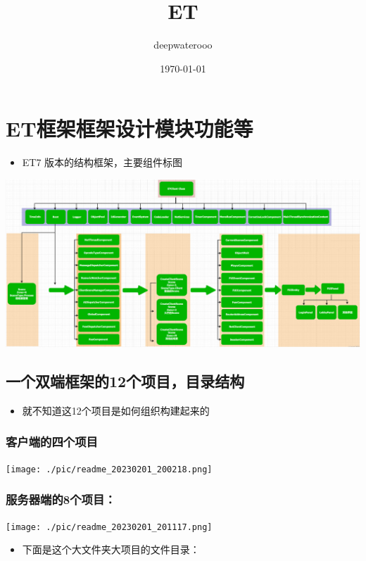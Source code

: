 \documentclass[9pt, b5paper]{article}
\author{deepwaterooo}
\date{\today}
\title{ET}
\begin{document}
\maketitle
\tableofcontents


\section{ET框架框架设计模块功能等}
\label{sec-1}
\begin{itemize}
\item ET7 版本的结构框架，主要组件标图
\end{itemize}

\includegraphics[width=.9\linewidth]{./pic/readme_20230217_092732.png}
\subsection{一个双端框架的12个项目，目录结构}
\label{sec-1-1}
\begin{itemize}
\item 就不知道这12个项目是如何组织构建起来的
\end{itemize}
\subsubsection{客户端的四个项目}
\label{sec-1-1-1}

\texttt{[image: ./pic/readme\_20230201\_200218.png]}
\subsubsection{服务器端的8个项目：}
\label{sec-1-1-2}

\texttt{[image: ./pic/readme\_20230201\_201117.png]}
\begin{itemize}
\item 下面是这个大文件夹大项目的文件目录：
\end{itemize}
\end{document}
